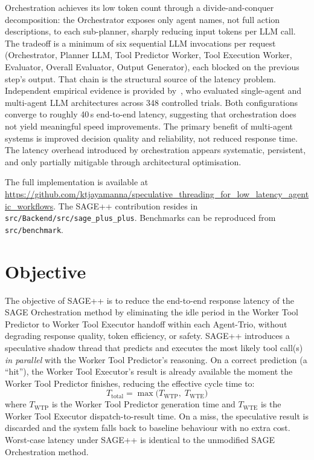 \documentclass[conference]{IEEEtran}
\newcommand{\twtp}{T_{\mathrm{WTP}}}   %
\newcommand{\twte}{T_{\mathrm{WTE}}}   %
\begin{document}
Orchestration achieves its low token count through a divide-and-conquer
decomposition: the Orchestrator exposes only agent names, not full action
descriptions, to each sub-planner, sharply reducing input tokens per LLM call.
The tradeoff is a minimum of six sequential LLM invocations per request
(Orchestrator, Planner LLM, Tool Predictor Worker, Tool Execution Worker,
Evaluator, Overall Evaluator, Output Generator), each blocked on the previous
step's output.
That chain is the structural source of the latency problem.
Independent empirical evidence is provided by~\cite{drammeh2025multiagent}, who
evaluated single-agent and multi-agent LLM architectures across 348 controlled
trials.
Both configurations converge to roughly 40\,s end-to-end latency, suggesting
that orchestration does not yield meaningful speed improvements.
The primary benefit of multi-agent systems is improved decision quality and
reliability, not reduced response time.
The latency overhead introduced by orchestration appears systematic, persistent,
and only partially mitigable through architectural optimisation.

The full implementation is available at \url{https://github.com/ktjayamanna/speculative_threading_for_low_latency_agentic_workflows}.
The SAGE++ contribution resides in \texttt{src/Backend/src/sage\_plus\_plus}.
Benchmarks can be reproduced from \texttt{src/benchmark}.

\section{Objective}
The objective of SAGE++ is to reduce the end-to-end response latency of the
SAGE Orchestration method by eliminating the idle period in the Worker Tool
Predictor to Worker Tool Executor handoff within each Agent-Trio, without
degrading response quality, token efficiency, or safety.
SAGE++ introduces a speculative shadow thread that predicts and executes the
most likely tool call(s) \emph{in parallel} with the Worker Tool Predictor's
reasoning.
On a correct prediction (a ``hit''), the Worker Tool Executor's result is
already available the moment the Worker Tool Predictor finishes, reducing the
effective cycle time to:
\begin{equation}
T_{\mathrm{total}} = \max\!\bigl(\twtp,\; \twte\bigr)
\label{eq:overlapped}
\end{equation}
where $\twtp$ is the Worker Tool Predictor generation time and $\twte$ is the
Worker Tool Executor dispatch-to-result time.
On a miss, the speculative result is discarded and the system falls back to
baseline behaviour with no extra cost.
Worst-case latency under SAGE++ is identical to the unmodified SAGE
Orchestration method.
\end{document}
